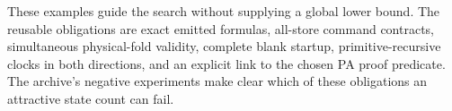 These examples guide the search without supplying a global lower bound.
The reusable obligations are exact emitted formulas, all-store command
contracts, simultaneous physical-fold validity, complete blank startup,
primitive-recursive clocks in both directions, and an explicit link to the
chosen PA proof predicate. The archive's negative experiments make clear
which of these obligations an attractive state count can fail.
